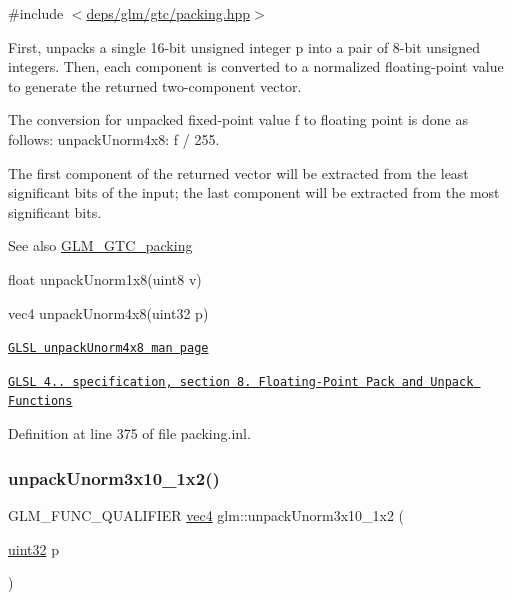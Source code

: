{\ttfamily \#include $<$\hyperlink{gtc_2packing_8hpp}{deps/glm/gtc/packing.\+hpp}$>$}

First, unpacks a single 16-\/bit unsigned integer p into a pair of 8-\/bit unsigned integers. Then, each component is converted to a normalized floating-\/point value to generate the returned two-\/component vector.

The conversion for unpacked fixed-\/point value f to floating point is done as follows\+: unpack\+Unorm4x8\+: f / 255.

The first component of the returned vector will be extracted from the least significant bits of the input; the last component will be extracted from the most significant bits.

\begin{DoxySeeAlso}{See also}
\hyperlink{group__gtc__packing}{G\+L\+M\+\_\+\+G\+T\+C\+\_\+packing} 

float unpack\+Unorm1x8(uint8 v) 

vec4 unpack\+Unorm4x8(uint32 p) 

\href{http://www.opengl.org/sdk/docs/manglsl/xhtml/unpackUnorm4x8.xml}{\tt G\+L\+SL unpack\+Unorm4x8 man page} 

\href{http://www.opengl.org/registry/doc/GLSLangSpec.4.20.8.pdf}{\tt G\+L\+SL 4.. specification, section 8. Floating-\/\+Point Pack and Unpack Functions} 
\end{DoxySeeAlso}


Definition at line 375 of file packing.\+inl.

\mbox{\label{group__gtc__packing_gaf69ace2b5e9234f8afb4e99c3df1193d}} 
\subsubsection{\texorpdfstring{unpack\+Unorm3x10\+\_\+1x2()}{unpackUnorm3x10\_1x2()}}
{\footnotesize\ttfamily G\+L\+M\+\_\+\+F\+U\+N\+C\+\_\+\+Q\+U\+A\+L\+I\+F\+I\+ER \hyperlink{group__core__types_ga5881b1b022d7fd1b7218f5916532dd02}{vec4} glm\+::unpack\+Unorm3x10\+\_\+1x2 (\begin{DoxyParamCaption}\item[{\hyperlink{group__gtc__type__precision_ga202b6a53c105fcb7e531f9b443518451}{uint32}}]{p }\end{DoxyParamCaption})}



